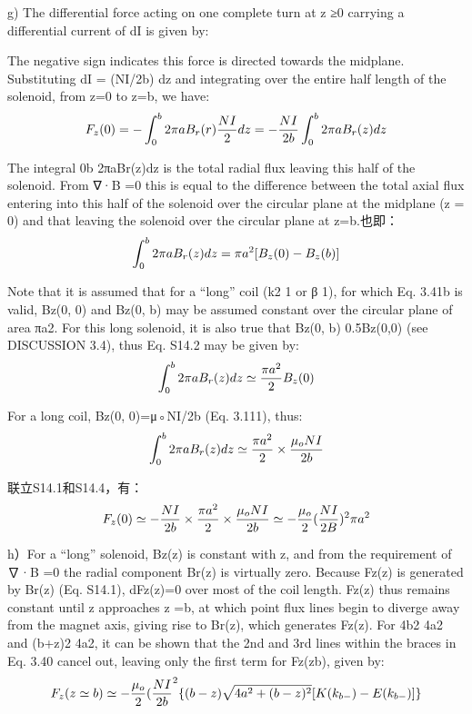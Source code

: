 g) The differential force acting on one complete turn at z ≥0 carrying a differential current of dI is given by:

The negative sign indicates this force is directed towards the midplane. Substituting dI = (NI/2b) dz and integrating over the entire half length of the solenoid,
from z=0 to z=b, we have:
$$
F_{z}(0)=-\int_{0}^{b}2\pi aB_{r}(r)\frac{NI}{2}dz=-\frac{NI}{2b}\int_{0}^{b}2\pi aB_{r}(z)dz\\%
$$

The integral 0b 2πaBr(z)dz is the total radial flux leaving this half of the solenoid.
From ∇·B =0 this is equal to the difference between the total axial flux entering
into this half of the solenoid over the circular plane at the midplane (z = 0) and
that leaving the solenoid over the circular plane at z=b.也即：
$$
\int_{0}^{b}2\pi aB_{r}(z)dz=\pi a^{2}[B_{z}(0)-B_{z}(b)]\\%
$$

Note that it is assumed that for a “long” coil (k2  1 or β   1), for which
Eq. 3.41b is valid, Bz(0, 0) and Bz(0, b) may be assumed constant over the circular
plane of area πa2. For this long solenoid, it is also true that Bz(0, b)  0.5Bz(0,0)
(see DISCUSSION 3.4), thus Eq. S14.2 may be given by:
$$
\int_{0}^{b}2\pi aB_{r}(z)dz\simeq\frac{\pi a^{2}}{2}B_{z}(0)\\%
$$

For a long coil, Bz(0, 0)=μ◦NI/2b (Eq. 3.111), thus:
$$
\int_{0}^{b}2\pi aB_{r}(z)dz\simeq\frac{\pi a^{2}}{2}\times\frac{\mu_{o}NI}{2b}\\%
$$

联立S14.1和S14.4，有：
$$
F_{z}(0)\simeq-\frac{NI}{2b}\times\frac{\pi a^{2}}{2}\times\frac{\mu_{o}NI}{2b}\simeq-\frac{\mu_{o}}{2}(\frac{NI}{2B})^{2}\pi a^{2}\\%
$$

h）For a “long” solenoid, Bz(z) is constant with z, and from the requirement of
∇·B =0 the radial component Br(z) is virtually zero. Because Fz(z) is generated
by Br(z) (Eq. S14.1), dFz(z)=0 over most of the coil length. Fz(z) thus remains
constant until z approaches z =b, at which point flux lines begin to diverge away
from the magnet axis, giving rise to Br(z), which generates Fz(z). For 4b2 4a2
and (b+z)2 4a2, it can be shown that the 2nd and 3rd lines within the braces in
Eq. 3.40 cancel out, leaving only the first term for Fz(zb), given by:
$$
F_{z}(z\simeq b)\simeq-\frac{\mu_{o}}{2}(\frac{NI}{2b}^{2}\{(b-z)\sqrt{4a^{2}+(b-z)^{2}}[K(k_{b-})-E(k_{b-})]\}\\%
$$

